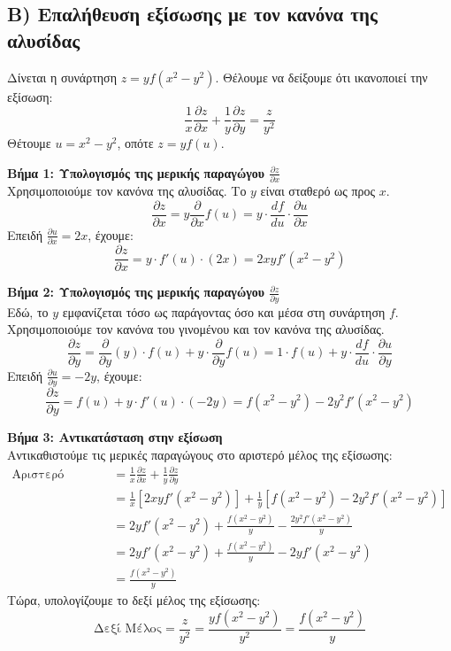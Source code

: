 \documentclass[a4paper,12pt,twoside]{article}
\begin{document}
\hrulefill
\vspace{1em}

\subsection*{B) Επαλήθευση εξίσωσης με τον κανόνα της αλυσίδας}
\noindent
Δίνεται η συνάρτηση $z = y f(x^2 - y^2)$. Θέλουμε να δείξουμε ότι ικανοποιεί την εξίσωση:
\[ \frac{1}{x} \frac{\partial z}{\partial x} + \frac{1}{y} \frac{\partial z}{\partial y} = \frac{z}{y^2} \]
Θέτουμε $u = x^2 - y^2$, οπότε $z = y f(u)$.

\noindent
\textbf{Βήμα 1: Υπολογισμός της μερικής παραγώγου $\frac{\partial z}{\partial x}$}\\
\noindent
Χρησιμοποιούμε τον κανόνα της αλυσίδας. Το $y$ είναι σταθερό ως προς $x$.
\[
\frac{\partial z}{\partial x} = y \frac{\partial}{\partial x}f(u) = y \cdot \frac{df}{du} \cdot \frac{\partial u}{\partial x}
\]
Επειδή $\frac{\partial u}{\partial x} = 2x$, έχουμε:
\[
\frac{\partial z}{\partial x} = y \cdot f'(u) \cdot (2x) = 2xy f'(x^2 - y^2)
\]

\noindent
\textbf{Βήμα 2: Υπολογισμός της μερικής παραγώγου $\frac{\partial z}{\partial y}$}\\
\noindent
Εδώ, το $y$ εμφανίζεται τόσο ως παράγοντας όσο και μέσα στη συνάρτηση $f$. Χρησιμοποιούμε τον κανόνα του γινομένου και τον κανόνα της αλυσίδας.
\[
\frac{\partial z}{\partial y} = \frac{\partial}{\partial y}(y) \cdot f(u) + y \cdot \frac{\partial}{\partial y}f(u) = 1 \cdot f(u) + y \cdot \frac{df}{du} \cdot \frac{\partial u}{\partial y}
\]
Επειδή $\frac{\partial u}{\partial y} = -2y$, έχουμε:
\[
\frac{\partial z}{\partial y} = f(u) + y \cdot f'(u) \cdot (-2y) = f(x^2 - y^2) - 2y^2 f'(x^2 - y^2)
\]

\noindent
\textbf{Βήμα 3: Αντικατάσταση στην εξίσωση}\\
\noindent
Αντικαθιστούμε τις μερικές παραγώγους στο αριστερό μέλος της εξίσωσης:
\begin{align*}
\text{Αριστερό Μέλος} &= \frac{1}{x} \frac{\partial z}{\partial x} + \frac{1}{y} \frac{\partial z}{\partial y} \\
&= \frac{1}{x} [2xy f'(x^2 - y^2)] + \frac{1}{y} [f(x^2 - y^2) - 2y^2 f'(x^2 - y^2)] \\
&= 2y f'(x^2 - y^2) + \frac{f(x^2 - y^2)}{y} - \frac{2y^2 f'(x^2 - y^2)}{y} \\
&= 2y f'(x^2 - y^2) + \frac{f(x^2 - y^2)}{y} - 2y f'(x^2 - y^2) \\
&= \frac{f(x^2 - y^2)}{y}
\end{align*}
Τώρα, υπολογίζουμε το δεξί μέλος της εξίσωσης:
\[
\text{Δεξί Μέλος} = \frac{z}{y^2} = \frac{y f(x^2 - y^2)}{y^2} = \frac{f(x^2 - y^2)}{y}
\]
\end{document}
